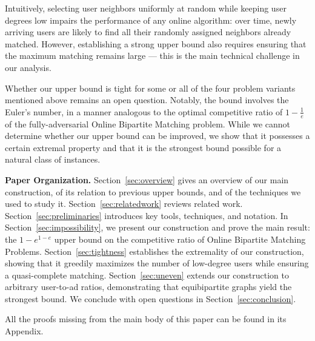 \documentclass[11pt]{article}
\begin{document}
Intuitively, selecting user neighbors uniformly at random while keeping user degrees low impairs the performance of any online algorithm: over time, newly arriving users are likely to find all their randomly assigned neighbors already matched. However, establishing a strong upper bound also requires ensuring that the maximum matching remains large --- this is the main technical challenge in our analysis.


\smallskip

Whether our upper bound is tight for some or all of the four problem variants mentioned above remains an open question. 
Notably, the bound involves the Euler's number, in a manner analogous to the optimal competitive ratio of $1-\frac1e$ of the fully-adversarial Online Bipartite Matching problem.
While we cannot determine whether our upper bound can be improved, we show that it possesses a certain extremal property and that it is the strongest bound possible for a  natural class of instances.




\smallskip
\noindent
{\bf Paper Organization.} Section~\ref{sec:overview} gives an overview of our main construction, of its relation to previous upper bounds,  and of the techniques we used to study it. Section~\ref{sec:relatedwork} reviews related work. Section~\ref{sec:preliminaries} introduces key tools, techniques, and notation. In Section~\ref{sec:impossibility}, we present our construction and prove the main result: the \( 1 - {e}^{1-e} \) upper bound on the competitive ratio of Online Bipartite Matching Problems. Section~\ref{sec:tightness} establishes the extremality of our construction, showing that it greedily maximizes the number of low-degree users while ensuring a quasi-complete matching. Section~\ref{sec:uneven} extends our construction to arbitrary user-to-ad ratios, demonstrating that equibipartite graphs yield the strongest bound. We conclude with open questions in Section~\ref{sec:conclusion}.

\smallskip

All the proofs missing from the main body of this paper can be found in its Appendix.
\end{document}
